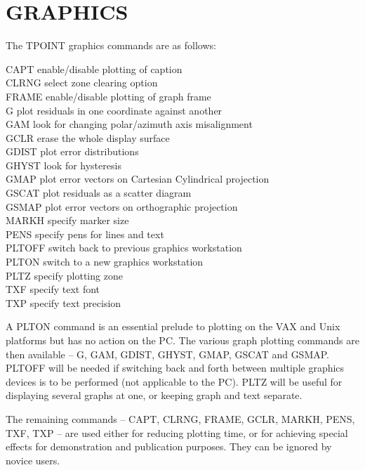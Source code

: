 \section{GRAPHICS}
The TPOINT graphics commands
are as follows:
\begin{cmnds}
\> \> CAPT   \> enable/disable plotting of caption \\
\> \> CLRNG  \> select zone clearing option \\
\> \> FRAME  \> enable/disable plotting of graph frame \\
\> \> G      \> plot residuals in one coordinate against another \\
\> \> GAM    \> look for changing polar/azimuth axis misalignment \\
\> \> GCLR   \> erase the whole display surface \\
\> \> GDIST  \> plot error distributions \\
\> \> GHYST  \> look for hysteresis \\
\> \> GMAP   \> plot error vectors on Cartesian Cylindrical projection \\
\> \> GSCAT  \> plot residuals as a scatter diagram \\
\> \> GSMAP  \> plot error vectors on orthographic projection \\
\> \> MARKH  \> specify marker size \\
\> \> PENS   \> specify pens for lines and text \\
\> \> PLTOFF \> switch back to previous graphics workstation \\
\> \> PLTON  \> switch to a new graphics workstation \\
\> \> PLTZ   \> specify plotting zone \\
\> \> TXF    \> specify text font \\
\> \> TXP    \> specify text precision
\end{cmnds}

A PLTON command is an essential prelude to plotting on the VAX
and Unix platforms but has no action on the PC.
The various graph plotting commands are
then available -- G, GAM, GDIST, GHYST, GMAP, GSCAT and GSMAP.
PLTOFF will be needed if switching back and forth between
multiple graphics devices is to be performed (not applicable to the PC).
PLTZ will be useful for displaying several
graphs at one, or keeping graph and text separate.

The remaining commands -- CAPT, CLRNG, FRAME, GCLR, MARKH,
PENS, TXF, TXP -- are used either for reducing plotting
time, or for achieving special effects for demonstration
and publication purposes.  They can be ignored by novice users.

